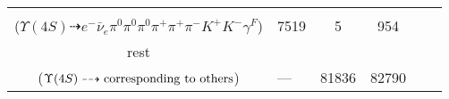 \documentclass[landscape]{article}
\newcounter{rownumbers}
\newcommand\rn{\stepcounter{rownumbers}\arabic{rownumbers}}
\newcommand{\EOLP}{\\ \hline} %
\newcommand{\topoTags}[1]{#1} %
\begin{document}
\begin{longtable}{clcccc}
\rn & \makecell[l]{ $ 
\Upsilon(4S) \rightarrow B^{+} B^{-} ,
B^{+} \rightarrow \rho^{+} \bar{D}^{0} ,
B^{-} \rightarrow e^{-} \bar{\nu}_{e} D^{0} \gamma^{F} ,
\rho^{+} \rightarrow \pi^{0} \pi^{+} ,
\bar{D}^{0} \rightarrow \pi^{0} \pi^{-} K^{+} ,
D^{0} \rightarrow \pi^{0} \pi^{+} K^{-} 
$ \\ ($
\Upsilon(4S) \dashrightarrow e^{-} \bar{\nu}_{e} \pi^{0} \pi^{0} \pi^{0} \pi^{+} \pi^{+} \pi^{-} K^{+} K^{-} \gamma^{F} 
$) } & \topoTags{7519 & }5 & 954 \EOLP

rest & \makecell[l]{ $ 
\Upsilon(4S) \rightarrow \rm{others \  (76062 \  in \  total)}
$ \\ ($
\Upsilon(4S) \dashrightarrow \rm{corresponding\ to\ others}
$) } & \topoTags{--- & }81836 & 82790 \\ \hline

\end{longtable}
\end{document}
